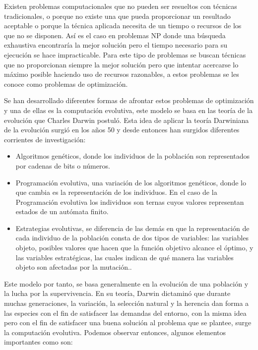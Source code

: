 Existen problemas computacionales que no pueden ser resueltos con técnicas tradicionales, o porque no existe una que pueda proporcionar un resultado aceptable o porque la técnica aplicada necesita de un tiempo o recursos de los que no se disponen. Así es el caso en problemas NP donde una búsqueda exhaustiva encontraría la mejor solución pero el tiempo necesario para su ejecución se hace impracticable. Para este tipo de problemas se buscan técnicas que no proporcionan siempre la mejor soluci\'on pero que intentar acercarse lo máximo posible haciendo uso de recursos razonables, a estos problemas se les conoce como problemas de optimizaci\'on.

Se han desarrollado diferentes formas de afrontar estos problemas de optimizaci\'on y una de ellas es la computación evolutiva, este modelo se basa en las teoría de la evolución que Charles Darwin postul\'o. Esta idea de aplicar la teor\'ia Darwiniana de la evolución surgió en los a\~nos 50 y desde entonces han surgidos diferentes corrientes de investigación:

\begin{itemize}
	\item Algoritmos genéticos, donde los individuos de la población son representados por cadenas de bits o números.
	\item Programación evolutiva, una variación de los algoritmos genéticos, donde lo que cambia es la representación de los individuos. En el caso de la Programación evolutiva los individuos son ternas cuyos valores representan estados de un autómata finito. 
	\item Estrategias evolutivas, se diferencia de las demás en que la representación de cada individuo de la población consta de dos tipos de variables: las variables objeto, posibles valores que hacen que la función objetivo alcance el óptimo, y las variables estratégicas, las cuales indican de qué manera las variables objeto son afectadas por la mutación.. 
\end{itemize}

Este modelo por tanto, se basa generalmente en la evolución de una población y la lucha por la supervivencia. En su teoría, Darwin dictamin\'o que durante muchas generaciones, la variación, la selección natural y la herencia dan forma a las especies con el fin de satisfacer las demandas del entorno, con la misma idea pero con el fin de satisfacer una buena solución al problema que se plantee, surge la computación evolutiva. Podemos observar entonces, algunos elementos importantes como son:

